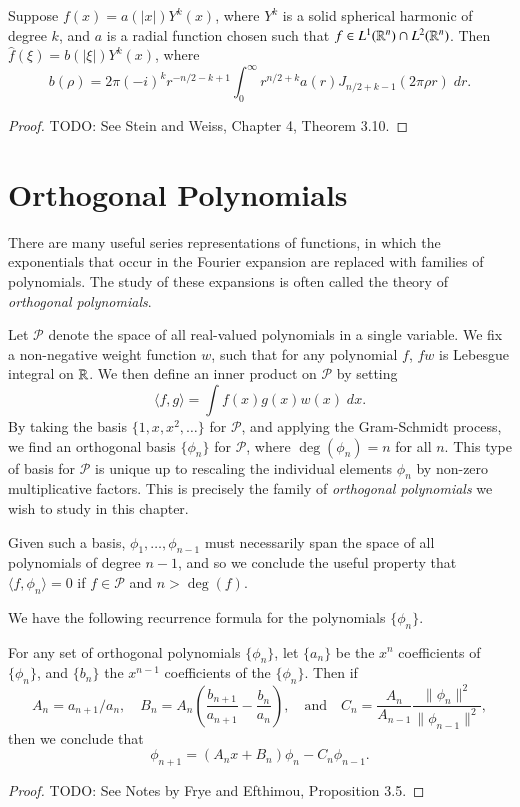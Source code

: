 \begin{theorem}
    Suppose $f(x) = a(|x|) Y^k(x)$, where $Y^k$ is a solid spherical harmonic of degree $k$, and $a$ is a radial function chosen such that $f \in L^1(\operatorname{\mathbb{R}}^n) \cap L^2(\operatorname{\mathbb{R}}^n)$. Then $\widehat{f}(\xi) = b(|\xi|) Y^k(x)$, where
    \[ b(\rho) = 2 \pi (-i)^k r^{-n/2 - k + 1} \int_0^\infty r^{n/2 + k} a(r) J_{n/2 + k - 1}(2 \pi \rho r)\; dr. \]
\end{theorem}
\begin{proof}
    TODO: See Stein and Weiss, Chapter 4, Theorem 3.10.
\end{proof}








\chapter{Orthogonal Polynomials}

There are many useful series representations of functions, in which the exponentials that occur in the Fourier expansion are replaced with families of polynomials. The study of these expansions is often called the theory of \emph{orthogonal polynomials}.

Let $\mathcal{P}$ denote the space of all real-valued polynomials in a single variable. We fix a non-negative weight function $w$, such that for any polynomial $f$, $f w$ is Lebesgue integral on $\operatorname{\mathbb{R}}$. We then define an inner product on $\mathcal{P}$ by setting
%
\[ \langle f, g \rangle = \int f(x) g(x) w(x)\; dx. \]
%
By taking the basis $\{ 1, x, x^2, \dots \}$ for $\mathcal{P}$, and applying the Gram-Schmidt process, we find an orthogonal basis $\{ \phi_n \}$ for $\mathcal{P}$, where $\deg(\phi_n) = n$ for all $n$. This type of basis for $\mathcal{P}$ is unique up to rescaling the individual elements $\phi_n$ by non-zero multiplicative factors. This is precisely the family of \emph{orthogonal polynomials} we wish to study in this chapter.

Given such a basis, $\phi_1,\dots,\phi_{n-1}$ must necessarily span the space of all polynomials of degree $n-1$, and so we conclude the useful property that $\langle f, \phi_n \rangle = 0$ if $f \in \mathcal{P}$ and $n > \deg(f)$.

We have the following recurrence formula for the polynomials $\{ \phi_n \}$.

\begin{lemma}
    For any set of orthogonal polynomials $\{ \phi_n \}$, let $\{ a_n \}$ be the $x^n$ coefficients of $\{ \phi_n \}$, and $\{ b_n \}$ the $x^{n-1}$ coefficients of the $\{ \phi_n \}$. Then if
    \[ A_n = a_{n+1} / a_n, \quad B_n = A_n \left( \frac{b_{n+1}}{a_{n+1}} - \frac{b_n}{a_n} \right), \quad\text{and}\quad C_n = \frac{A_n}{A_{n-1}} \frac{\| \phi_n \|^2}{\| \phi_{n-1} \|^2}, \]
    then we conclude that
    \[ \phi_{n+1} = (A_n x + B_n) \phi_n - C_n \phi_{n-1}. \]
\end{lemma}
\begin{proof}
    TODO: See Notes by Frye and Efthimou, Proposition 3.5.
\end{proof}

